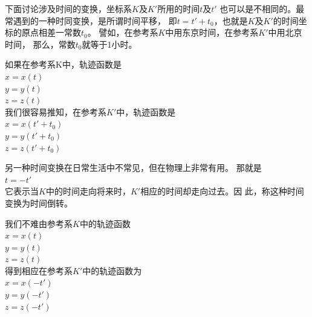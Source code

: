 \documentclass[../outline-of-mechanics.tex]{subfiles}
\begin{document}
下面讨论涉及时间的变换，坐标系$K$及$K'$所用的时间$t$及$t'$
也可以是不相同的。最常遇到的一种时同变换，是所谓时间平移，
即$t=t'+t_0$，也就是$K$及$K'$的时间坐标的原点相差一常数$t_0$。
譬如，在参考系$K$中用东京时间，在参考系$K'$中用北京时间，
那么，常数$t_0$就等于1小时。

如果在参考系K中，轨迹函数是\vspace{-0.2em}
\\\null\hspace{6em}$x=x\left(t\right)$
\\\null\hspace{6em}$y=y\left(t\right)$
\\\null\hspace{6em}$z=z\left(t\right)$\\
我们很容易推知，在参考系$K'$中，轨迹函数是\vspace{-0.2em}
\\\null\hspace{6em}$x=x\left(t'+t_0\right)$
\\\null\hspace{6em}$y=y\left(t'+t_0\right)$
\\\null\hspace{6em}$z=z\left(t'+t_0\right)$

另一种时间变换在日常生活中不常见，但在物理上非常有用。
那就是\vspace{-0.5em}
\\\null\hspace{6em}$t=-t'$\\
它表示当$K$中的时间走向将来时，$K'$相应的时间却走向过去。因
此，称这种时间变换为时间倒转。

我们不难由参考系$K$中的轨迹函数\vspace{-0.2em}
\\\null\hspace{6em}$x=x\left(t\right)$
\\\null\hspace{6em}$y=y\left(t\right)$
\\\null\hspace{6em}$z=z\left(t\right)$\\
得到相应在参考系$K'$中的轨迹函数为\vspace{-0.2em}
\\\null\hspace{6em}$x=x\left(-t'\right)$
\\\null\hspace{6em}$y=y\left(-t'\right)$
\\\null\hspace{6em}$z=z\left(-t'\right)$
\end{document}
